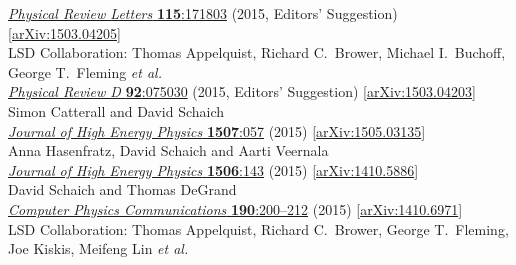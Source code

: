 \begin{spacelist}
\begin{revnumerate}
      \href{https://doi.org/10.1103/PhysRevLett.115.171803}{\textit{Physical Review Letters} \textbf{115}:171803} (2015, Editors' Suggestion) [\href{http://arxiv.org/abs/1503.04205}{arXiv:1503.04205}]
    \pagebreakitem
       \\
      LSD Collaboration: Thomas Appelquist, Richard C.~Brower, Michael I.~Buchoff, George T.~Fleming \textit{et al.} \\ %
      \href{https://doi.org/10.1103/PhysRevD.92.075030}{\textit{Physical Review D} \textbf{92}:075030} (2015, Editors' Suggestion) [\href{http://arxiv.org/abs/1503.04203}{arXiv:1503.04203}]
    \pagebreakitem
       \\
      Simon Catterall and David Schaich \\
      \href{https://doi.org/10.1007/JHEP07(2015)057}{\textit{Journal of High Energy Physics} \textbf{1507}:057} (2015) [\href{http://arxiv.org/abs/1505.03135}{arXiv:1505.03135}]
    \pagebreakitem
       \\
      Anna Hasenfratz, David Schaich and Aarti Veernala \\
      \href{https://doi.org/10.1007/JHEP06(2015)143}{\textit{Journal of High Energy Physics} \textbf{1506}:143} (2015) [\href{http://arxiv.org/abs/1410.5886}{arXiv:1410.5886}]
    \pagebreakitem
       \\
      David Schaich and Thomas DeGrand \\
      \href{https://doi.org/10.1016/j.cpc.2014.12.025}{\textit{Computer Physics Communications} \textbf{190}:200--212} (2015) [\href{http://arxiv.org/abs/1410.6971}{arXiv:1410.6971}]
    \pagebreakitem
       \\
      LSD Collaboration: Thomas Appelquist, Richard C.~Brower, George T.~Fleming, Joe Kiskis, Meifeng Lin \textit{et al.} \\ %

\end{revnumerate}
\end{spacelist}
